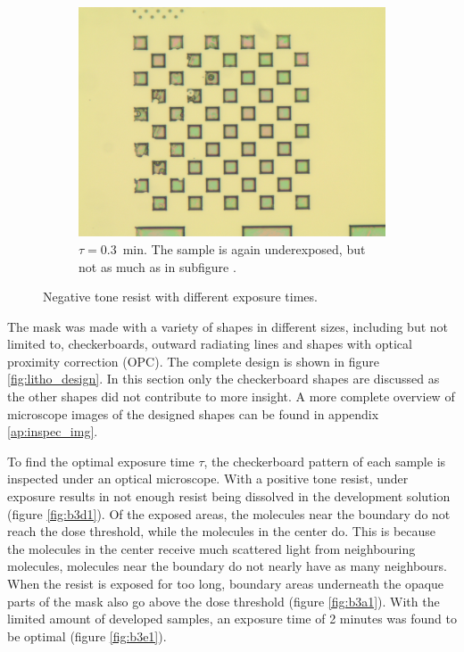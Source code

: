 \begin{figure}[!b]
    \hfill
    \begin{subfigure}[t]{0.3\linewidth}
        \centering
        \includegraphics[width=\textwidth]{data/b2i1.jpg}
	    \caption{$\tau = 0.3$~min. The sample is again underexposed, but not as much as in subfigure .}
	    \label{fig:b2i1}
    \end{subfigure}
    \caption{Negative tone resist with different exposure times.}
\end{figure}

The mask was made with a variety of shapes in different sizes, including but not limited to, checkerboards, outward radiating lines and shapes with optical proximity correction (OPC). The complete design is shown in figure \ref{fig:litho_design}. In this section only the checkerboard shapes are discussed as the other shapes did not contribute to more insight. A more complete overview of microscope images of the designed shapes can be found in appendix \ref{ap:inspec_img}.

To find the optimal exposure time $\tau$, the checkerboard pattern of each sample is inspected under an optical microscope. With a positive tone resist, under exposure results in not enough resist being dissolved in the development solution (figure \ref{fig:b3d1}). Of the exposed areas, the molecules near the boundary do not reach the dose threshold, while the molecules in the center do. This is because the molecules in the center receive much scattered light from neighbouring molecules, molecules near the boundary do not nearly have as many neighbours. When the resist is exposed for too long, boundary areas underneath the opaque parts of the mask also go above the dose threshold (figure \ref{fig:b3a1}). With the limited amount of developed samples, an exposure time of 2 minutes was found to be optimal (figure \ref{fig:b3e1}). 

